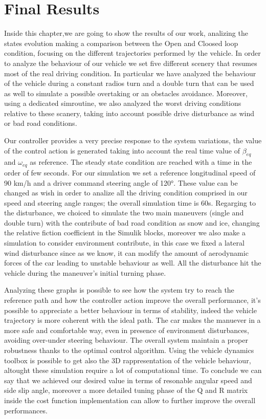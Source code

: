 
\chapter{Final Results}
Inside this chapter,we are going to show the results of our work, analizing the states evolution making a comparison between the Open and Cloosed loop condition, focusing on the different trajectories performed by the vehicle. In order to analyze the behaviour of our vehicle we set five different scenery that resumes most of the real driving condition. In particular we have analyzed the behaviour of the vehicle during a constant radios turn and a double turn that can be used as well to simulate a possible overtaking or an obstacles avoidance. Moreover, using a dedicated simroutine, we also analyzed the worst driving conditions relative to these scanery, taking into account possible drive disturbance as wind or bad road conditions.

Our controller provides a very precise response to the system variations, the value of the control action is generated taking into account the real time value of $\beta_{eq}$ and $\omega_{eq}$ as reference. The steady state condition are reached with a time in the order of few seconds. For our simulation we set a reference longitudinal speed of 90 km/h and a driver command steering angle of 120°. These value can be changed as wish in order to analize all the driving condition comprised in our speed and steering angle ranges; the overall simulation time is 60s. Regarging to the disturbance, we choiced to simulate the two main maneuvers (single and double turn) with the contribute of bad road condition as snow and ice, changing the relative fiction coefficient in the Simulik blocks, moreover we also make a simulation to consider environment contribute, in this case we fixed a lateral wind disturbance since as we know, it can modify the amount of aerodynamic forces of the car leading to unstable behaviour as well. All the disturbance hit the vehicle during the maneuver's initial turning phase.

Analyzing these graphs is possible to see how the system try to reach the reference path and how the controller action improve the overall performance, it’s possible to appreciate a better behaviour in terms of stability, indeed the vehicle trajectory is more coherent with the ideal path. The car makes the manuever in a more safe and comfortable way, even in presence of environment  disturbances, avoiding over-under steering behaviour. The overall system maintain a proper robustness thanks to the optimal control algorithm. Using the vehicle dynamics toolbox is possible to get also the 3D rappresentation of the vehicle behaviour, altought these simulation require a lot of computational time. To conclude we can say that we achieved our desired value in terms of resonable angular speed and side slip angle, moreover a more detailed tuning phase of the Q and R matrix inside the cost function implementation can allow to further improve the overall performances.

